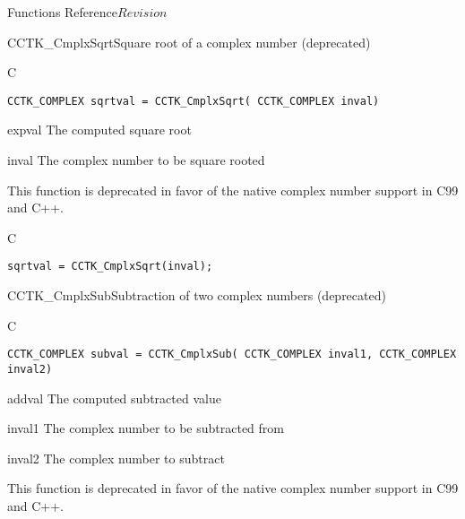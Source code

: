 \begin{cactuspart}{ Functions Reference}{}{$Revision$}
\begin{FunctionDescription}{CCTK\_CmplxSqrt}{Square root of a complex number (deprecated)}
\label{CCTK-CmplxSqrt}
\begin{SynopsisSection}
\begin{Synopsis}{C}
\begin{verbatim}CCTK_COMPLEX sqrtval = CCTK_CmplxSqrt( CCTK_COMPLEX inval)\end{verbatim}
\end{Synopsis}
\end{SynopsisSection}
\begin{ParameterSection}
\begin{Parameter}{expval}
The computed square root
\end{Parameter}
\begin{Parameter}{inval}
The complex number to be square rooted
\end{Parameter}
\end{ParameterSection}
\begin{Discussion}
This function is deprecated in favor of the native complex number support in
C99 and C++.
\end{Discussion}
\begin{ExampleSection}
\begin{Example}{C}
\begin{verbatim}
sqrtval = CCTK_CmplxSqrt(inval);
\end{verbatim}
\end{Example}
\end{ExampleSection}
\end{FunctionDescription}

\begin{FunctionDescription}{CCTK\_CmplxSub}{Subtraction of two complex numbers (deprecated)}
\label{CCTK-CmplxSub}
\begin{SynopsisSection}
\begin{Synopsis}{C}
\begin{verbatim}CCTK_COMPLEX subval = CCTK_CmplxSub( CCTK_COMPLEX inval1, CCTK_COMPLEX inval2)\end{verbatim}
\end{Synopsis}
\end{SynopsisSection}
\begin{ParameterSection}
\begin{Parameter}{addval}
The computed subtracted value
\end{Parameter}
\begin{Parameter}{inval1}
The complex number to be subtracted from
\end{Parameter}
\begin{Parameter}{inval2}
The complex number to subtract
\end{Parameter}
\end{ParameterSection}
\begin{Discussion}
This function is deprecated in favor of the native complex number support in
C99 and C++.


\end{Discussion}
\end{FunctionDescription}
\end{cactuspart}
